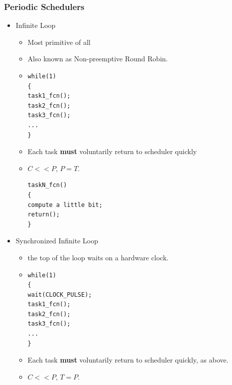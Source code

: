\subsubsection{Periodic Schedulers}
\begin{itemize}	%

        \item	%
Infinite Loop
        \begin{itemize}
                \item Most primitive of all
                \item Also known as Non-preemptive Round Robin.
                \item \begin{verbatim}
while(1)
{
task1_fcn();
task2_fcn();
task3_fcn();
...
}
                \end{verbatim}
                \item Each task {\bf must} voluntarily return to
                scheduler quickly
                \item $C << P$, $P=T$.

\begin{verbatim}
taskN_fcn()
{
compute a little bit;
return();
}
\end{verbatim}
      \end{itemize}



        \item	%
Synchronized Infinite Loop
        \begin{itemize}
                \item the top of the loop waits on a hardware clock.
                \item \begin{verbatim}
while(1)
{
wait(CLOCK_PULSE);
task1_fcn();
task2_fcn();
task3_fcn();
...
}
                \end{verbatim}
                \item Each task {\bf must} voluntarily return to
                scheduler quickly, as above.
                \item $C << P$, $T=P$.
        \end{itemize}

\end{itemize}	%

